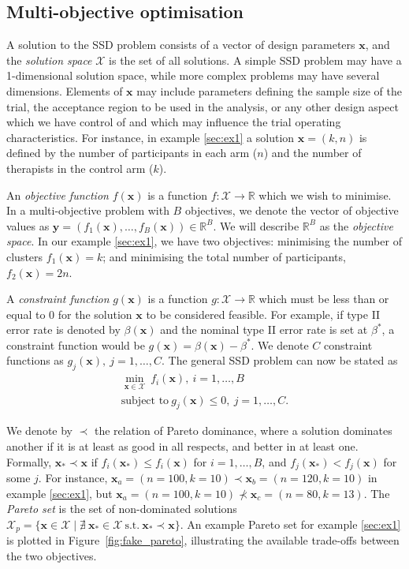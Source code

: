\documentclass[]{sagej}
\begin{document}
\subsection{Multi-objective optimisation}\label{sec:optimisation}

A solution to the SSD problem consists of a vector of design parameters $\mathbf{x}$, and the \emph{solution space} $\mathcal{X}$ is the set of all solutions. A simple SSD problem may have a 1-dimensional solution space, while more complex problems may have several dimensions. Elements of $\mathbf{x}$ may include parameters defining the sample size of the trial, the acceptance region to be used in the analysis, or any other design aspect which we have control of and which may influence the trial operating characteristics. For instance, in example \ref{sec:ex1} a solution $\mathbf{x} = (k, n)$ is defined by the number of participants in each arm ($n$) and the number of therapists in the control arm ($k$).

An \emph{objective function} $f(\mathbf{x})$ is a function $f : \mathcal{X} \rightarrow \mathbb{R}$ which we wish to minimise. In a multi-objective problem with $B$ objectives, we denote the vector of objective values as $\mathbf{y} = (f_{1}(\mathbf{x}), \ldots, f_{B}(\mathbf{x})) \in \mathbb{R}^{B}$. We will describe $\mathbb{R}^{B}$ as the \emph{objective space}. In our example \ref{sec:ex1}, we have two objectives: minimising the number of clusters $f_1(\mathbf{x}) = k$; and minimising the total number of participants, $f_2(\mathbf{x}) = 2n$.

A \emph{constraint function} $g(\mathbf{x})$ is a function $g : \mathcal{X} \rightarrow \mathbb{R}$ which must be less than or equal to 0 for the solution $\mathbf{x}$ to be considered feasible. For example, if type II error rate is denoted by $\beta(\mathbf{x})$ and the nominal type II error rate is set at $\beta^{*}$, a constraint function would be $g(\mathbf{x}) = \beta(\mathbf{x}) - \beta^{*}$. We denote $C$ constraint functions as $g_{j}(\mathbf{x}),~j=1,\ldots , C$. The general SSD problem can now be stated as
\begin{align}
\min_{\mathbf{x} \in \mathcal{X}} {~ f_{i}(\mathbf{x})}, ~ i = 1, \ldots , B \\
\text{subject to} ~ g_{j}(\mathbf{x}) \leq 0, ~ j = 1, \ldots , C.
\end{align}

We denote by $\prec$ the relation of Pareto dominance, where a solution dominates another if it is at least as good in all respects, and better in at least one. Formally, $\mathbf{x}_{*} \prec \mathbf{x}$ if $f_{i}(\mathbf{x}_{*}) \leq f_{i}(\mathbf{x})$ for $i = 1, \ldots , B$, and $f_{j}(\mathbf{x}_{*}) < f_{j}(\mathbf{x})$ for some $j$. For instance, $\mathbf{x}_a = (n=100, k=10) \prec \mathbf{x}_b = (n=120, k=10)$ in example \ref{sec:ex1}, but $\mathbf{x}_a = (n=100, k=10) \nprec \mathbf{x}_c = (n=80, k=13)$. The \emph{Pareto set} is the set of non-dominated solutions $\mathcal{X}_{p} = \{\mathbf{x} \in \mathcal{X} \mid \nexists ~ \mathbf{x}_{*}  \in \mathcal{X} ~\text{s.t.}~ \mathbf{x}_{*} \prec \mathbf{x} \}$. An example Pareto set for example \ref{sec:ex1} is plotted in Figure~\ref{fig:fake_pareto}, illustrating the available trade-offs between the two objectives.
\end{document}
